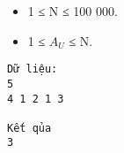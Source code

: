 \begin{itemize}
	\item     1 ≤ N ≤ 100 000.   
	\item     1 ≤ $A_{U}$    ≤ N.   
\end{itemize}
\begin{verbatim}
Dữ liệu:
5
4 1 2 1 3

Kết qủa
3
\end{verbatim}